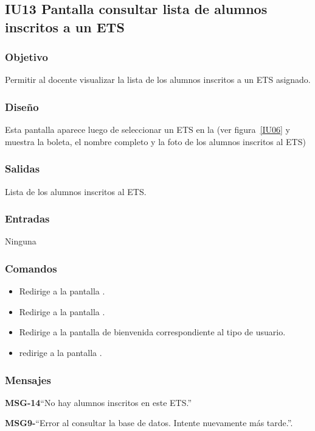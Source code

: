 \subsection{IU13 Pantalla consultar lista de alumnos inscritos a un ETS}

\subsubsection{Objetivo}
Permitir al docente visualizar la lista de los alumnos inscritos a un ETS asignado.

\subsubsection{Diseño}
Esta pantalla aparece luego de seleccionar un ETS en la  (ver figura~\ref{IU06} y muestra la boleta, el nombre completo y la foto de los alumnos inscritos al ETS)


\subsubsection{Salidas}
Lista de los alumnos inscritos al ETS.

\subsubsection{Entradas}
Ninguna

\subsubsection{Comandos}
\begin{itemize}
    \item {} Redirige a la pantalla .
    \item {} Redirige a la pantalla .
    \item {} Redirige a la pantalla de bienvenida correspondiente al tipo de usuario.
	\item {} redirige a la pantalla .
\end{itemize}

\subsubsection{Mensajes}

\begin{Citemize}
	\item {\bf MSG-14}{``No hay alumnos inscritos en este ETS.''}
	\item {\bf MSG9-}{``Error al consultar la base de datos. Intente nuevamente más tarde.''}. 
\end{Citemize}